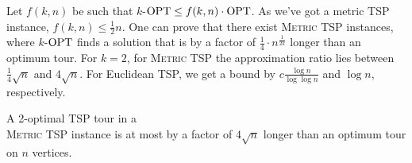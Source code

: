 \documentclass[../skript.tex]{subfiles}
\begin{document}
Let $f(k, n)$ be such that $k$-$\operatorname{OPT} \leq f(k, n) \cdot \operatorname{OPT}$. As we've got a metric TSP instance, $f(k, n) \leq \frac{1}{2} n$.
One can prove that there exist \textsc{Metric TSP} instances, where $k$-$\operatorname{OPT}$ finds a solution that is by a factor of $\frac{1}{4} \cdot n^{\frac{1}{2k}}$ longer than an optimum tour.
For $k = 2$, for \textsc{Metric TSP} the approximation ratio lies between $\frac{1}{4} \sqrt{n}$ and $4 \sqrt{n}$. For Euclidean TSP, we get a bound by $c \frac{\log n}{\log \log n}$ and $\log n$, respectively.
\begin{theorem} %
\label{thm:89}
A 2-optimal TSP tour in a \\\textsc{Metric TSP} instance is at most by a factor of $4 \sqrt{n}$ longer than an optimum tour on $n$ vertices.
\end{theorem}
\end{document}
